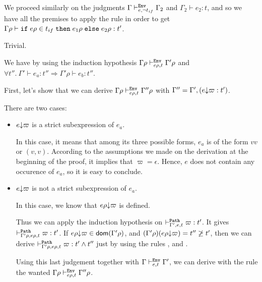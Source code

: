 \documentclass[a4paper]{article}
\theoremstyle{definition}
\begin{document}
\begin{description}
          We proceed similarly on the judgments $\Gamma\vdash^{\texttt{Env}}_{e,\neg t_{if}} \Gamma_2$ and $\Gamma_2\vdash e_2:t$, and so we have all the premises
          to apply the  rule in order to get $\Gamma\rho \vdash \texttt{if}\;e\rho\in t_{if}\;\texttt{then}\;e_1\rho\;\texttt{else}\;e_2\rho:t'$. 

          \item[\Rule{Base}] Trivial.
          \item[\Rule{Path}] We have by using the induction hypothesis $\Gamma\rho \vdash^{\texttt{Env}}_{e\rho,t} \Gamma'\rho$
          and $\forall t''.\ \Gamma' \vdash e_a : t'' \Rightarrow \Gamma'\rho \vdash e_b:t''$.
          
          First, let's show that we can derive $\Gamma\rho \vdash^{\texttt{Env}}_{e\rho,t} {\Gamma''}\rho$ with $\Gamma''=\Gamma',(e{\downarrow}\varpi:t')$.
          
          There are two cases:
          \begin{itemize}
            \item $e{\downarrow}\varpi$ is a strict subexpression of $e_a$.
            
            In this case, it means that among its three possible forms,
            $e_a$ is of the form $v v$ or $(v,v)$.
            According to the assumptions we made on the derivation at the beginning of the proof,
            it implies that $\varpi=\epsilon$.
            Hence, $e$ does not contain any occurence of $e_a$, so it is easy to conclude.

            \item $e{\downarrow}\varpi$ is not a strict subexpression of $e_a$.
            
            In this case, we know that $e\rho{\downarrow}\varpi$ is defined.

            Thus we can apply the induction hypothesis on $\vdash^{\texttt{Path}}_{\Gamma',e,t} \varpi:t'$.
            It gives $\vdash^{\texttt{Path}}_{\Gamma'\rho,e\rho,t} \varpi:t'$.
            If $e\rho{\downarrow}\varpi \in\textsf{dom}(\Gamma'\rho)$, and $(\Gamma'\rho)(e\rho{\downarrow}\varpi)=t''\not\geq t'$,
            then we can derive $\vdash^{\texttt{Path}}_{\Gamma'\rho,e\rho,t} \varpi:t'\land t''$ just by using the rules
            ,  and .

            Using this last judgement together with $\Gamma \vdash^{\texttt{Env}}_{e,t} \Gamma'$, we can derive with the rule 
            the wanted $\Gamma\rho \vdash^{\texttt{Env}}_{e\rho,t} {\Gamma''}\rho$.
          \end{itemize}


\end{description}
\end{document}
